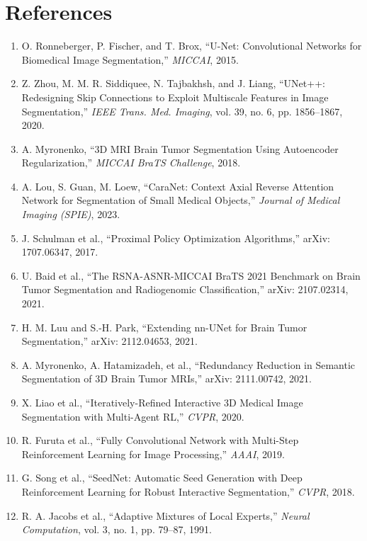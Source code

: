 \documentclass[11pt,a4paper]{article}
\begin{document}
\section*{References}
\begin{enumerate}
    \item[1] O. Ronneberger, P. Fischer, and T. Brox, ``U-Net: Convolutional Networks for Biomedical Image Segmentation,'' \textit{MICCAI}, 2015.
    \item[2] Z. Zhou, M. M. R. Siddiquee, N. Tajbakhsh, and J. Liang, ``UNet++: Redesigning Skip Connections to Exploit Multiscale Features in Image Segmentation,'' \textit{IEEE Trans. Med. Imaging}, vol. 39, no. 6, pp. 1856--1867, 2020.
    \item[3] A. Myronenko, ``3D MRI Brain Tumor Segmentation Using Autoencoder Regularization,'' \textit{MICCAI BraTS Challenge}, 2018.
    \item[4] A. Lou, S. Guan, M. Loew, ``CaraNet: Context Axial Reverse Attention Network for Segmentation of Small Medical Objects,'' \textit{Journal of Medical Imaging (SPIE)}, 2023.
    \item[5] J. Schulman et al., ``Proximal Policy Optimization Algorithms,'' arXiv: 1707.06347, 2017.
    \item[6] U. Baid et al., ``The RSNA-ASNR-MICCAI BraTS 2021 Benchmark on Brain Tumor Segmentation and Radiogenomic Classification,'' arXiv: 2107.02314, 2021.
    \item[7] H. M. Luu and S.-H. Park, ``Extending nn-UNet for Brain Tumor Segmentation,'' arXiv: 2112.04653, 2021.
    \item[8] A. Myronenko, A. Hatamizadeh, et al., ``Redundancy Reduction in Semantic Segmentation of 3D Brain Tumor MRIs,'' arXiv: 2111.00742, 2021.
    \item[9] X. Liao et al., ``Iteratively-Refined Interactive 3D Medical Image Segmentation with Multi-Agent RL,'' \textit{CVPR}, 2020.
    \item[10] R. Furuta et al., ``Fully Convolutional Network with Multi-Step Reinforcement Learning for Image Processing,'' \textit{AAAI}, 2019.
    \item[11] G. Song et al., ``SeedNet: Automatic Seed Generation with Deep Reinforcement Learning for Robust Interactive Segmentation,'' \textit{CVPR}, 2018.
    \item[12] R. A. Jacobs et al., ``Adaptive Mixtures of Local Experts,'' \textit{Neural Computation}, vol. 3, no. 1, pp. 79--87, 1991.
\end{enumerate}
\end{document}
